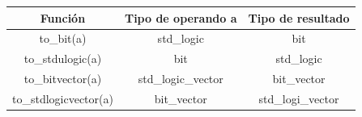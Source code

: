 \begin{table}[H]
	\begin{tabular}{|c|c|c|}
		\hline
		\rowcolor{gray}
		Función               & Tipo de operando a & Tipo de resultado \\
		\hline
		to\_bit(a)            & std\_logic         & bit               \\
		\hline
		to\_stdulogic(a)      & bit                & std\_logic        \\
		\hline
		to\_bitvector(a)      & std\_logic\_vector & bit\_vector       \\
		\hline
		to\_stdlogicvector(a) & bit\_vector        & std\_logi\_vector \\
		\hline
	\end{tabular}
\end{table}

